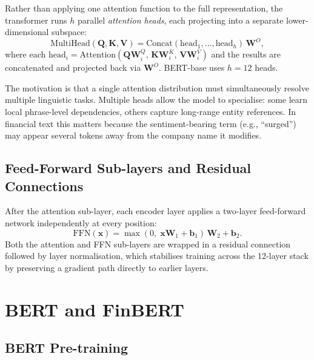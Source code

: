 Rather than applying one attention function to the full representation,
the transformer runs $h$ parallel \emph{attention heads}, each projecting into a separate
lower-dimensional subspace:
\begin{equation}
  \text{MultiHead}(\mathbf{Q},\mathbf{K},\mathbf{V})
  = \text{Concat}(\text{head}_1,\ldots,\text{head}_h)\,\mathbf{W}^O,
  \label{eq:mha}
\end{equation}
where each $\text{head}_i = \text{Attention}(\mathbf{Q}\mathbf{W}_i^Q,\,
\mathbf{K}\mathbf{W}_i^K,\, \mathbf{V}\mathbf{W}_i^V)$ and the results are concatenated
and projected back via $\mathbf{W}^O$.
BERT-base uses $h = 12$ heads.

The motivation is that a single attention distribution must simultaneously resolve
multiple linguistic tasks.
Multiple heads allow the model to specialise: some learn local phrase-level dependencies,
others capture long-range entity references.
In financial text this matters because the sentiment-bearing term (e.g., ``surged'')
may appear several tokens away from the company name it modifies.

\subsection{Feed-Forward Sub-layers and Residual Connections}

After the attention sub-layer, each encoder layer applies a two-layer feed-forward network
independently at every position:
\begin{equation}
  \text{FFN}(\mathbf{x}) = \max(0,\;\mathbf{x}\mathbf{W}_1 + \mathbf{b}_1)\,\mathbf{W}_2 + \mathbf{b}_2.
  \label{eq:ffn}
\end{equation}
Both the attention and FFN sub-layers are wrapped in a residual connection followed by
layer normalisation, which stabilises training across the 12-layer stack by preserving
a gradient path directly to earlier layers.

\section{BERT and FinBERT}

\subsection{BERT Pre-training}

